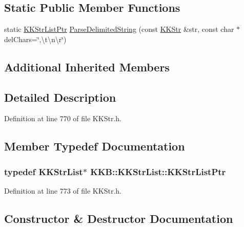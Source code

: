 \subsection*{Static Public Member Functions}
\begin{DoxyCompactItemize}
\item 
static \hyperlink{class_k_k_b_1_1_k_k_str_list_a466accb870aa75f4b47943932fccb4c8}{K\+K\+Str\+List\+Ptr} \hyperlink{class_k_k_b_1_1_k_k_str_list_a1685b0a8cb9d04d5f37be0e7b7fc0407}{Parse\+Delimited\+String} (const \hyperlink{class_k_k_b_1_1_k_k_str}{K\+K\+Str} \&str, const char $\ast$del\+Chars=\char`\"{},\textbackslash{}t\textbackslash{}n\textbackslash{}r\char`\"{})
\end{DoxyCompactItemize}
\subsection*{Additional Inherited Members}


\subsection{Detailed Description}


Definition at line 770 of file K\+K\+Str.\+h.



\subsection{Member Typedef Documentation}
\subsubsection[{\texorpdfstring{K\+K\+Str\+List\+Ptr}{KKStrListPtr}}]{\setlength{\rightskip}{0pt plus 5cm}typedef {\bf K\+K\+Str\+List}$\ast$ {\bf K\+K\+B\+::\+K\+K\+Str\+List\+::\+K\+K\+Str\+List\+Ptr}}\hypertarget{class_k_k_b_1_1_k_k_str_list_a466accb870aa75f4b47943932fccb4c8}{}\label{class_k_k_b_1_1_k_k_str_list_a466accb870aa75f4b47943932fccb4c8}


Definition at line 773 of file K\+K\+Str.\+h.



\subsection{Constructor \& Destructor Documentation}
